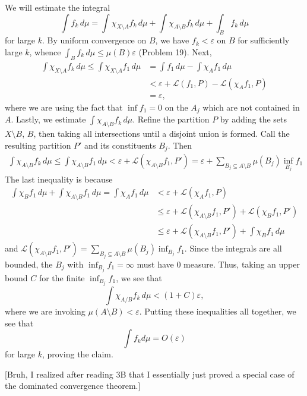 \documentclass[11pt,oneside]{book}
\begin{document}
\begin{solution}
    We will estimate the integral \[\int f_k \, d\mu = \int \chi_{X\setminus A} f_k \, d\mu + \int \chi_{A\setminus B} f_k \, d\mu + \int_B f_k \, d\mu\] for large $k$. By uniform convergence on $B$, we have $f_k < \varepsilon$ on $B$ for sufficiently large $k$, whence $\int_B f_k \, d\mu \leq \mu(B) \varepsilon$ (Problem 19). Next, 
    \begin{align*}
        \int \chi_{X\setminus A} f_k \, d\mu \leq \int \chi_{X\setminus A} f_1 \, d\mu &= \int f_1 \, d\mu - \int \chi_A f_1 \, d\mu \\
        &< \varepsilon + \mathscr{L}(f_1, P) - \mathscr{L}(\chi_A f_1, P) \\
        &= \varepsilon,
    \end{align*} 
    where we are using the fact that $\inf{f_1} = 0$ on the $A_j$ which are not contained in $A$. Lastly, we estimate $\int \chi_{A\setminus B} f_k \, d\mu$. Refine the partition $P$ by adding the sets $X \setminus B$, $B$, then taking all intersections until a disjoint union is formed. Call the resulting partition $P'$ and its constituents $B_j$. Then 
    \begin{align*}
        \int \chi_{A \setminus B} f_k \, d\mu \leq \int \chi_{A \setminus B} f_1 \, d\mu < \varepsilon + \mathscr{L}(\chi_{A \setminus B}f_1, P') = \varepsilon + \sum_{B_j \subseteq A \setminus B} \mu(B_j)\inf_{B_j} f_1
    \end{align*}
    The last inequality is because 
    \begin{align*}
        \int \chi_B f_1 \, d\mu + \int \chi_{A\setminus B} f_1 \, d\mu = \int \chi_A f_1 \, d\mu &< \varepsilon + \mathscr{L}(\chi_A f_1, P) \\
        &\leq \varepsilon + \mathscr{L}(\chi_{A \setminus B} f_1, P') + \mathscr{L}(\chi_B f_1, P') \\
        &\leq \varepsilon + \mathscr{L}(\chi_{A \setminus B} f_1, P') + \int \chi_B f_1 \, d\mu
    \end{align*}
    and $\mathscr{L}(\chi_{A \setminus B} f_1, P') = \sum_{B_j \subseteq A \setminus B} \mu(B_j) \inf_{B_j} f_1$. Since the integrals are all bounded, the $B_j$ with $\inf_{B_j} f_1 = \infty$ must have $0$ measure. Thus, taking an upper bound $C$ for the finite $\inf_{B_j} f_1$, we see that \[\int \chi_{A/B} f_k \, d\mu < (1 + C)\varepsilon,\] where we are invoking $\mu(A \setminus B) < \varepsilon$. Putting these inequalities all together, we see that \[\int f_k d\mu = O(\varepsilon)\] for large $k$, proving the claim.

    [Bruh, I realized after reading 3B that I essentially just proved a special case of the dominated convergence theorem.]
\end{solution}
\end{document}

